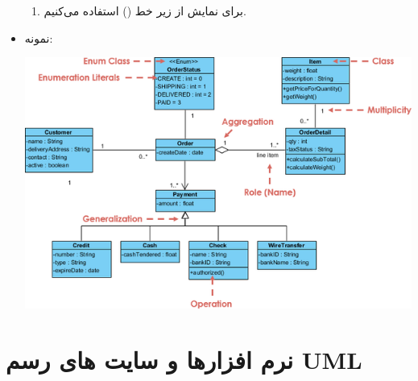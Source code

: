 \documentclass[]{article}
\begin{document}
\begin{itemize}[label=\textcolor{listColor}{$\blacklozenge$}]
   \begin{enumerate}

\item
برای نمایش   از زیر خط () استفاده می‌کنیم.   
   
   \end{enumerate}
   
   \newpage
    \item
   {\fehrest \textcolor{listColor}{نمونه: }}
   

	 \begin{center}


  \includegraphics[width=1.0\textwidth]{images/image14.png}
 



\end{center}


\end{itemize}






\newpage

\section*{{\titr نرم افزارها و سایت های رسم UML}}
\end{document}
